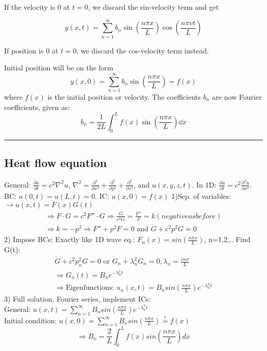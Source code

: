 \documentclass[10pt,a4paper]{article}
\newcommand{\oneinfsum}{\sum_{n=1}^{\infty}}
\newcommand{\holine}[1][\medskipamount]{\par\vspace*{\dimexpr-\parskip-\baselineskip+#1}\noindent\rule{\linewidth}{1pt}\par\vspace*{\dimexpr-\parskip-.5\baselineskip+#1}}
\begin{document}
\begin{multicols}{2}
If the velocity is 0 at $t=0$, we discard the sin-velocity term and get

\[
    y(x,t) = \oneinfsum b_n\sin(\frac{n\pi x}{L})\cos(\frac{n\pi v t}{L})
\]

If position is 0 at $t=0$, we discard the cos-velocity term instead.

Initial position will be on the form
\[
    y(x,0) = \oneinfsum b_n \sin(\frac{n\pi x}{L}) = f(x)
\]
where $f(x)$ is the initial position or velocity. The coefficients $b_n$ are now Fourier coefficients, given as:
\[
    b_n = \frac{1}{2L}\int_{0}^{L} f(x)\sin(\frac{n\pi x}{L}) \dd{x}
\]



\holine
\subsection*{Heat flow equation}
General: $\frac{\partial u}{\partial t} = c^{2}\nabla^{2}u$, $\nabla^{2} = \frac{\partial^{2}}{\partial x^{2}} + \frac{\partial^{2}}{\partial y^{2}} + \frac{\partial^{2}}{\partial z^{2}}$, and $u(x,y,z,t)$.
In 1D: $\frac{\partial u}{\partial t}=c^{2}\frac{\partial^{2}u}{\partial x^{2}}$. BC: $u(0,t)=u(L,t)=0$. IC: $u(x,0)=f(x)$ 1)Sep. of variables: $\rightarrow u(x,t) = F(x)G(t)$ 
\begin{align*}
    \Rightarrow F\cdot \dot G = c^{2}F''\cdot G \Rightarrow \frac{\dot G}{c^{2}G} = \frac{F''}{F}=k (negative as before) \\
    \Rightarrow k = -p^{2} \Rightarrow F'' + p^{2}F = 0 \text{ and } \dot G + c^{2}p^{2}G=0
\end{align*}
2) Impose BCs: Exactly like 1D wave eq.: $F_{n}(x)=sin(\frac{n\pi x}{L})$, n=1,2,.. Find G(t):
\begin{align*}
    \dot G + c^{2}p_{n}^{2}G=0 \text{ or } \dot G_{n} + \lambda_{n}^{2}G_{n} = 0, \lambda_{n} = \frac{cn\pi}{L} \\
    \Rightarrow G_{n}(t) = B_{n}e^{-\lambda_{n}^{2}t} \\
    \Rightarrow \text{Eigenfunctions: } u_{n}(x,t) = B_{n}sin(\frac{n\pi x}{L})e^{-\lambda_{n}^{2}t}
\end{align*}
3) Full solution, Fourier series, implement ICs: \\
General: \(u(x,t) = \sum_{n=1}^{\infty}B_{n}sin(\frac{n\pi x}{L})e^{-\lambda_{n}^{2}t} \)\\
Initial condition: \(u(x,0)= \sum_{n=1}^{\infty}B_{n}sin(\frac{n\pi x}{L}) \overset{!}{=}f(x)\) \[\Rightarrow B_{n}=\frac{2}{L}\int_{0}^{L}f(x)sin(\frac{n\pi x}{L})dx\]


\end{multicols}
\end{document}
